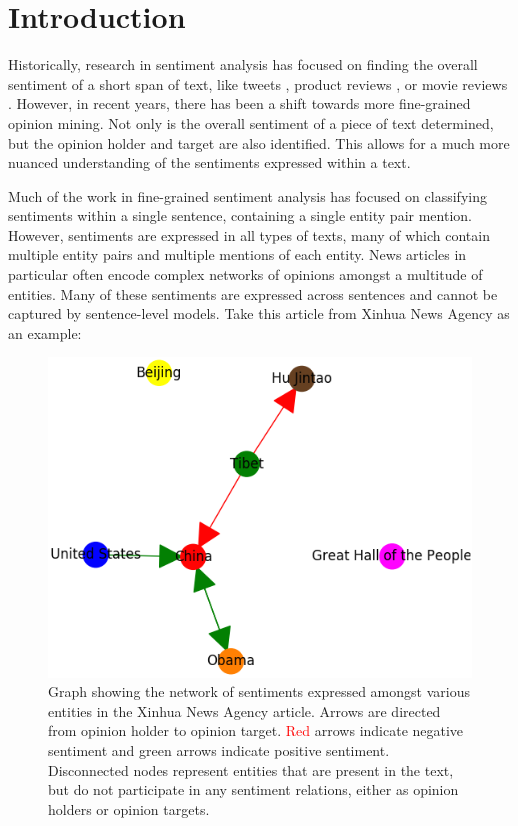 \documentclass[11pt,a4paper]{article}
\begin{document}
\section{Introduction}
Historically, research in sentiment analysis has focused on finding the overall sentiment of a short span of text, like tweets \citep{DBLP:journals/corr/MohammadKZ13, DBLP:journals/corr/abs-1804-00482, DBLP:journals/corr/abs-1803-08910}, product reviews \citep{Fang2015}, or movie reviews \citep{DBLP:journals/corr/cs-CL-0409058}.
However, in recent years, there has been a shift towards more fine-grained opinion mining.
Not only is the overall sentiment of a piece of text determined, but the opinion holder and target are also identified.
This allows for a much more nuanced understanding of the sentiments expressed within a text.
\par Much of the work in fine-grained sentiment analysis has focused on classifying sentiments within a single sentence, containing a single entity pair mention.
However, sentiments are expressed in all types of texts, many of which contain multiple entity pairs and multiple mentions of each entity.
News articles in particular often encode complex networks of opinions amongst a multitude of entities.
Many of these sentiments are expressed across sentences and cannot be captured by sentence-level models.
Take this article from Xinhua News Agency as an example:
\begin{figure} \label{fig:intro}
\centering
\includegraphics[scale=0.5]{example_article.png}
\caption{Graph showing the network of sentiments expressed amongst various entities in the Xinhua News Agency article. Arrows are directed from opinion holder to opinion target. \textcolor{red}{Red} arrows indicate negative sentiment and \textcolor[rgb]{0, 0.5, 0}{green} arrows indicate positive sentiment. Disconnected nodes represent entities that are present in the text, but do not participate in any sentiment relations, either as opinion holders or opinion targets.}
\end{figure}
\end{document}
